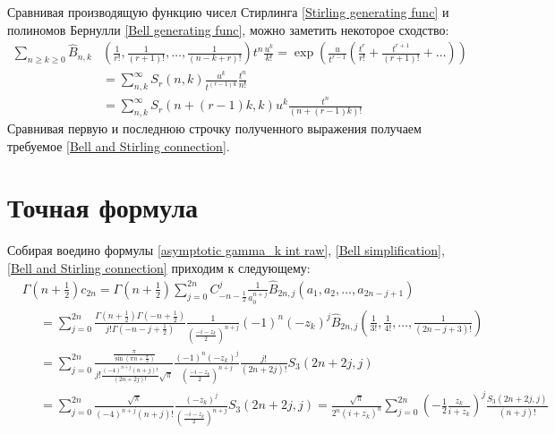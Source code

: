 \documentclass[a4paper, 12pt]{article}
\newenvironment{eqw}{\begin{equation} \begin{aligned}}   
    {\end{aligned}    \end{equation}}
\begin{document}
Сравнивая производящую функцию чисел Стирлинга \eqref{Stirling generating func} и полиномов Бернулли \eqref{Bell generating func}, можно заметить некоторое сходство:
\begin{eqw}
    \sum\limits_{n\geq k\geq 0} 
    \hat{B}_{n, k}&\left(\frac{1}{r!}, \frac{1}{(r+1)!}, \dots, \frac{1}{(n-k+r)!}\right) t^n \frac{u^k}{k!} = 
    \exp\left(\frac{u}{t^{r-1}} \left(\frac{t^r}{r!} + \frac{t^{r+1}}{(r+1)!}+\dots \right)\right) \\ 
    &= \sum\limits_{n, k}^{\infty} S_{r}(n, k) \frac{u^k}{t^{(r-1)k}}\frac{t^n}{n!} \\
    &= \sum\limits_{n, k}^{\infty} S_{r}(n+(r-1)k, k) u^k\frac{t^n}{(n+(r-1)k)!}
\end{eqw}
Сравнивая первую и последнюю строчку полученного выражения получаем требуемое \eqref{Bell and Stirling connection}.
\section*{Точная формула}
Собирая воедино формулы \eqref{asymptotic gamma_k int raw}, \eqref{Bell simplification}, \eqref{Bell and Stirling connection} приходим к следующему:
\begin{eqw}
    &\Gamma\left(n+\frac{1}{2}\right) c_{2n} =
    \Gamma\left(n+\frac{1}{2}\right) \sum\limits_{j=0}^{2n} C_{-n-\frac{1}{2}}^j\frac{1}{a_0^{n+j}}
    \hat{B}_{2n, j}\left(a_1, a_2, \dots, a_{2n-j+1}\right) \\
    &\;\;\;\;\; = 
    \sum\limits_{j=0}^{2n} \frac{\Gamma\left(n+\frac{1}{2}\right)\Gamma\left(-n+\frac{1}{2}\right)}{j!\Gamma\left(-n-j+\frac{1}{2}\right)}
    \frac{1}{\left(\frac{-i-z_k}{2}\right)^{n+j}}
    (-1)^n (-z_k)^j\hat B_{2n, j}\left(\frac{1}{3!}, \frac{1}{4!}, \dots, \frac{1}{(2n-j+3)!}\right)\\
    &\;\;\;\;\; = 
    \sum\limits_{j=0}^{2n} \frac{\frac{\pi}{\sin\left(\pi n + \frac{\pi}{2}\right)}}{j!\frac{(-4)^{n+j}(n+j)!}{(2n+2j)!}\sqrt{\pi}}
    \frac{(-1)^n (-z_k)^j}{\left(\frac{-i-z_k}{2}\right)^{n+j}} \frac{j!}{(2n+2j)!}S_3(2n+2j, j)\\
    &\;\;\;\;\; = 
    \sum\limits_{j=0}^{2n} \frac{\sqrt{\pi}}{(-4)^{n+j}(n+j)!}
    \frac{(-z_k)^j}{\left(\frac{-i-z_k}{2}\right)^{n+j}} S_3(2n+2j, j) = 
    \frac{\sqrt{\pi}}{2^n(i+z_k)^n}
    \sum\limits_{j=0}^{2n} \left(-\frac{1}{2}\frac{z_k}{i+z_k}\right)^{j}\frac{S_3(2n+2j, j)}{(n+j)!}
\end{eqw}
\end{document}
